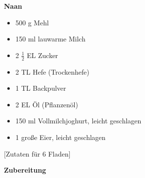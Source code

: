 \documentclass[a6paper, twoside]{report}
\begin{document}
\textbf{{\LARGE Naan}}%


\hrulefill
\vspace*{\fill}
\begin{multicols}{2}	


\begin{itemize}
\item 500 g 	Mehl
\item 150 ml 	lauwarme Milch
\item 2 $\frac{1}{2}$ EL Zucker
\item 2 TL 	Hefe (Trockenhefe)
\item 1 TL 	Backpulver
\item 2 EL 	Öl (Pflanzenöl)
\item 150 ml 	Vollmilchjoghurt, leicht geschlagen
\item 1 große 	Eier, leicht geschlagen

\end{itemize}

\end{multicols}

\vspace{2cm}
\begin{center}
[Zutaten für 6 Fladen]
\end{center}


\vfill
\newpage
\textbf{{\LARGE Zubereitung}}%

\hrulefill
\end{document}
